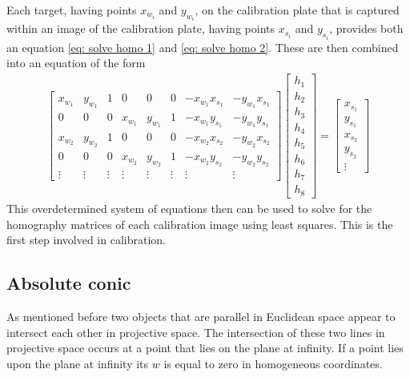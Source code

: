 Each target, having points $x_{w_i}$ and $y_{w_i}$, on the calibration plate that is captured within an image of the calibration plate, having points $x_{s_i}$ and $y_{s_i}$, provides both an equation \ref{eq: solve homo 1} and \ref{eq: solve homo 2}. These are then combined into an equation of the form
\begin{align}
	\begin{bmatrix}
	x_{w_1} & y_{w_1} & 1 & 0 & 0 & 0 & -x_{w_1} x_{s_1} & -y_{w_1} x_{s_1} \\
	0 & 0 & 0 & x_{w_1} & y_{w_1} & 1 & -x_{w_1} y_{s_1} & -y_{w_1} y_{s_1} \\
	x_{w_2} & y_{w_2} & 1 & 0 & 0 & 0 & -x_{w_2} x_{s_2} & -y_{w_2} x_{s_2} \\
	0 & 0 & 0 & x_{w_2} & y_{w_2} & 1 & -x_{w_2} y_{s_2} & -y_{w_2} y_{s_2} \\
	\vdots & \vdots & \vdots & \vdots & \vdots & \vdots & \vdots & \vdots 
	\end{bmatrix}
	\begin{bmatrix}
	h_1 \\
	h_2 \\
	h_3 \\
	h_4 \\
	h_5 \\
	h_6 \\
	h_7 \\
	h_8
	\end{bmatrix} =
	\begin{bmatrix}
	x_{s_1} \\
	y_{s_1} \\
	x_{s_2} \\
	y_{s_2} \\
	\vdots
	\end{bmatrix}
\end{align}
This overdetermined system of equations then can be used to solve for the homography matrices of each calibration image using least squares. This is the first step involved in calibration. 

\subsection{Absolute conic}
\label{sec: abs conic}
As mentioned before two objects that are parallel in Euclidean space appear to intersect each other in projective space. The intersection of these two lines in projective space occurs at a point that lies on the plane at infinity. If a point lies upon the plane at infinity its $w$ is equal to zero in homogeneous coordinates.


